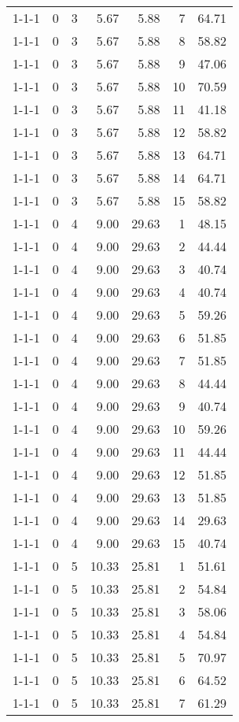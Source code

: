\begin{tabular}{lrrrrrr}
1-1-1 & 0 & 3 & 5.67 & 5.88 & 7 & 64.71 \\
1-1-1 & 0 & 3 & 5.67 & 5.88 & 8 & 58.82 \\
1-1-1 & 0 & 3 & 5.67 & 5.88 & 9 & 47.06 \\
1-1-1 & 0 & 3 & 5.67 & 5.88 & 10 & 70.59 \\
1-1-1 & 0 & 3 & 5.67 & 5.88 & 11 & 41.18 \\
1-1-1 & 0 & 3 & 5.67 & 5.88 & 12 & 58.82 \\
1-1-1 & 0 & 3 & 5.67 & 5.88 & 13 & 64.71 \\
1-1-1 & 0 & 3 & 5.67 & 5.88 & 14 & 64.71 \\
1-1-1 & 0 & 3 & 5.67 & 5.88 & 15 & 58.82 \\
1-1-1 & 0 & 4 & 9.00 & 29.63 & 1 & 48.15 \\
1-1-1 & 0 & 4 & 9.00 & 29.63 & 2 & 44.44 \\
1-1-1 & 0 & 4 & 9.00 & 29.63 & 3 & 40.74 \\
1-1-1 & 0 & 4 & 9.00 & 29.63 & 4 & 40.74 \\
1-1-1 & 0 & 4 & 9.00 & 29.63 & 5 & 59.26 \\
1-1-1 & 0 & 4 & 9.00 & 29.63 & 6 & 51.85 \\
1-1-1 & 0 & 4 & 9.00 & 29.63 & 7 & 51.85 \\
1-1-1 & 0 & 4 & 9.00 & 29.63 & 8 & 44.44 \\
1-1-1 & 0 & 4 & 9.00 & 29.63 & 9 & 40.74 \\
1-1-1 & 0 & 4 & 9.00 & 29.63 & 10 & 59.26 \\
1-1-1 & 0 & 4 & 9.00 & 29.63 & 11 & 44.44 \\
1-1-1 & 0 & 4 & 9.00 & 29.63 & 12 & 51.85 \\
1-1-1 & 0 & 4 & 9.00 & 29.63 & 13 & 51.85 \\
1-1-1 & 0 & 4 & 9.00 & 29.63 & 14 & 29.63 \\
1-1-1 & 0 & 4 & 9.00 & 29.63 & 15 & 40.74 \\
1-1-1 & 0 & 5 & 10.33 & 25.81 & 1 & 51.61 \\
1-1-1 & 0 & 5 & 10.33 & 25.81 & 2 & 54.84 \\
1-1-1 & 0 & 5 & 10.33 & 25.81 & 3 & 58.06 \\
1-1-1 & 0 & 5 & 10.33 & 25.81 & 4 & 54.84 \\
1-1-1 & 0 & 5 & 10.33 & 25.81 & 5 & 70.97 \\
1-1-1 & 0 & 5 & 10.33 & 25.81 & 6 & 64.52 \\
1-1-1 & 0 & 5 & 10.33 & 25.81 & 7 & 61.29 \\

\end{tabular}
